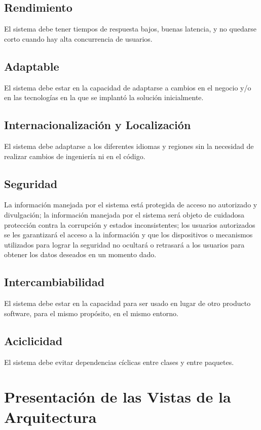 \documentclass{article}
\begin{document}
\subsection{Rendimiento}
El sistema debe tener tiempos de respuesta bajos, buenas latencia, y no quedarse corto cuando hay alta concurrencia de usuarios.

\subsection{Adaptable}
El sistema debe estar en la capacidad de adaptarse a cambios en el negocio y/o en las tecnologías en la que se implantó la solución inicialmente.

\subsection{Internacionalización y Localización}
El sistema debe adaptarse a los diferentes idiomas y regiones sin la necesidad de realizar cambios de ingeniería ni en el código.

\subsection{Seguridad} 
La información manejada por el sistema está protegida de acceso no autorizado y divulgación; la información manejada por el sistema será objeto de cuidadosa protección contra la corrupción y estados inconsistentes; los usuarios autorizados se les garantizará el acceso a la información y que los dispositivos o mecanismos utilizados para lograr la seguridad no ocultará o retrasará a los usuarios para obtener los datos deseados en un momento dado. 

\subsection{Intercambiabilidad}
El sistema debe estar en la capacidad para ser usado en lugar de otro producto software, para el mismo propósito, en el mismo entorno.

\subsection{Aciclicidad}
El sistema debe evitar dependencias cíclicas entre clases y entre paquetes.

\newpage
\section{Presentación de las Vistas de la Arquitectura}
\end{document}

